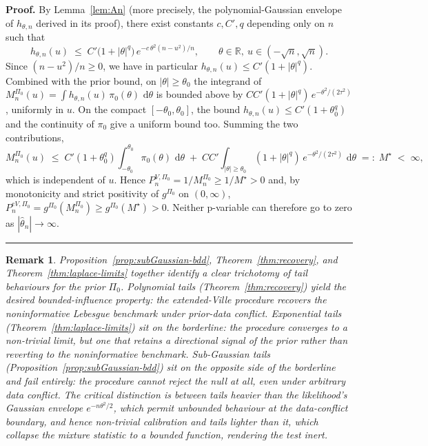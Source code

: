 \documentclass{article}%
\newtheorem{remark}[theorem]{Remark}
\newenvironment{proof}[1][Proof]{\noindent\textbf{#1.} }{\ \rule{0.5em}{0.5em}}
\newcommand{\dd}{\,\mathrm{d}}
\begin{document}
\begin{proof}
    By Lemma~\ref{lem:An} (more precisely, the polynomial-Gaussian
envelope of \(h_{\theta,n}\) derived in its proof), there exist
constants \(c, C', q\) depending only on \(n\) such that
\begin{equation}\label{eq:h-env-uniform}
  h_{\theta,n}(u)
  \;\leq\; C'\bigl(1+|\theta|^q\bigr)\,e^{-c\,\theta^2(n-u^2)/n},
  \qquad \theta\in\mathbb{R},\ u\in(-\sqrt n,\sqrt n).
\end{equation}
Since \((n-u^2)/n\geq 0\), we have in particular
\(h_{\theta,n}(u)\leq C'(1+|\theta|^q)\). Combined with the prior
bound, on \(|\theta|\geq\theta_0\) the integrand of
\(M_n^{\Pi_0}(u)=\int h_{\theta,n}(u)\,\pi_0(\theta)\,\dd\theta\) is
bounded above by \(C C'(1+|\theta|^q)\,e^{-\theta^2/(2\tau^2)}\),
uniformly in \(u\). On the compact \([-\theta_0,\theta_0]\), the
bound \(h_{\theta,n}(u)\leq C'(1+\theta_0^q)\) and the continuity of
\(\pi_0\) give a uniform bound too. Summing the two contributions,
\[
  M_n^{\Pi_0}(u)
  \;\leq\;
  C'(1+\theta_0^q)\!\int_{-\theta_0}^{\theta_0}\!\pi_0(\theta)\,\dd\theta
  \;+\; C C'\!\int_{|\theta|\geq\theta_0}\!(1+|\theta|^q)\,
  e^{-\theta^2/(2\tau^2)}\,\dd\theta
  \;=:\; M^\star\;<\;\infty,
\]
which is independent of \(u\). Hence
\(P_n^{V,\Pi_0}=1/M_n^{\Pi_0}\geq 1/M^\star>0\) and, by monotonicity
and strict positivity of \(g^{\Pi_0}\) on \((0,\infty)\),
\(P_n^{eV,\Pi_0}=g^{\Pi_0}(M_n^{\Pi_0})\geq g^{\Pi_0}(M^\star)>0\).
Neither p-variable can therefore go to zero as
\(|\widehat\theta_n|\to\infty\).
\end{proof}


\begin{remark}\label{rem:tail-trichotomy}
Proposition~\ref{prop:subGaussian-bdd}, Theorem~\ref{thm:recovery},
and Theorem~\ref{thm:laplace-limits} together identify a clear
trichotomy of tail behaviours for the prior \(\Pi_0\). Polynomial
tails (Theorem~\ref{thm:recovery}) yield the desired
bounded-influence property: the extended-Ville procedure recovers
the noninformative Lebesgue benchmark under prior-data conflict.
Exponential tails (Theorem~\ref{thm:laplace-limits}) sit on the
borderline: the procedure converges to a non-trivial limit, but one
that retains a directional signal of the prior rather than reverting
to the noninformative benchmark. Sub-Gaussian tails
(Proposition~\ref{prop:subGaussian-bdd}) sit on the opposite side of
the borderline and fail entirely: the procedure cannot reject the
null at all, even under arbitrary data conflict. The critical
distinction is between tails heavier than the likelihood's Gaussian
envelope \(e^{-n\theta^2/2}\), which permit unbounded behaviour at
the data-conflict boundary, and hence non-trivial calibration and
tails lighter than it, which collapse the mixture statistic to a
bounded function, rendering the test inert.
\end{remark}
\end{document}
